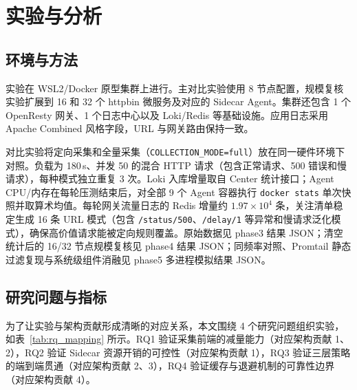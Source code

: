 \section{实验与分析}

\subsection{环境与方法}
实验在 WSL2/Docker 原型集群上进行。主对比实验使用 8 节点配置，规模复核实验扩展到 16 和 32 个 httpbin 微服务及对应的 Sidecar Agent。集群还包含 1 个 OpenResty 网关、1 个日志中心以及 Loki/Redis 等基础设施。应用日志采用 Apache Combined 风格字段，URL 与网关路由保持一致。

对比实验将定向采集和全量采集（\texttt{COLLECTION\_MODE=full}）放在同一硬件环境下对照。负载为 180\,s、并发 50 的混合 HTTP 请求（包含正常请求、500 错误和慢请求），每种模式独立重复 3 次。Loki 入库增量取自 Center 统计接口；Agent CPU/内存在每轮压测结束后，对全部 9 个 Agent 容器执行 \texttt{docker stats} 单次快照并取算术均值。每轮网关流量日志的 Redis 增量约 $1.97\times10^4$ 条，关注清单稳定生成 16 条 URL 模式（包含 \texttt{/status/500}、\texttt{/delay/1} 等异常和慢请求泛化模式），确保高价值请求能被定向规则覆盖。原始数据见 phase3 结果 JSON；清空统计后的 16/32 节点规模复核见 phase4 结果 JSON；同频率对照、Promtail 静态过滤复现与系统级组件消融见 phase5 多进程模拟结果 JSON。

\subsection{研究问题与指标}
为了让实验与架构贡献形成清晰的对应关系，本文围绕 4 个研究问题组织实验，如表~\ref{tab:rq_mapping} 所示。RQ1 验证采集前端的减量能力（对应架构贡献 1、2），RQ2 验证 Sidecar 资源开销的可控性（对应架构贡献 1），RQ3 验证三层策略的端到端贯通（对应架构贡献 2、3），RQ4 验证缓存与退避机制的可靠性边界（对应架构贡献 4）。

\begin{table}[htbp]
  \centering
  \small
  \caption{研究问题、指标与证据映射}\label{tab:rq_mapping}
\end{table}

